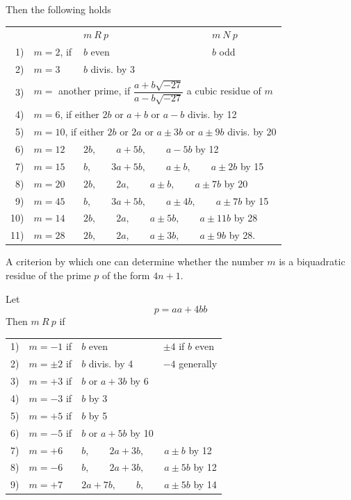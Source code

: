 \noindent\unskip{}Then the following holds
\begin{center}\footnotesize\setlength{\tabcolsep}{3pt}
\begin{tabular}{@{}rlll@{}}
& &$m\ R\ p$&$m\ N\ p$\\
1)&$m=2$, if&$b$ even&$b$ odd\\
2)&$m=3$&$b$ divis. by 3&\\
3)&\multicolumn{3}{l}{$m={}$ another prime, if $\dfrac{a+b\sqrt{-27}}{a-b\sqrt{-27}}$ a cubic residue of $m$}\\[5pt]
4)&\multicolumn{3}{l}{$m=6$, if either $2b$ or $a+b$ or $a-b$ divis. by 12}\\
5)&\multicolumn{3}{l}{$m=10$, if either $2b$ or $2a$ or $a\pm3b$ or $a\pm9b$ divis. by 20}\\
6)&$m=12$&\multicolumn{2}{l}{$2b,\qquad a+5b,\qquad a-5b$ by 12}\\
7)&$m=15$&\multicolumn{2}{l}{$b,\qquad 3a+5b,\qquad a\pm b,\qquad a\pm2b$ by 15}\\
8)&$m=20$&\multicolumn{2}{l}{$2b,\qquad2a,\qquad a\pm b,\qquad a\pm7b$ by 20}\\
9)&$m=45$&\multicolumn{2}{l}{$b,\qquad3a+5b,\qquad a\pm4b,\qquad a\pm7b$ by 15}\\
10)&$m=14$&\multicolumn{2}{l}{$2b,\qquad2a,\qquad a\pm5b,\qquad a\pm11b$ by 28}\\
11)&$m=28$&\multicolumn{2}{l}{$2b,\qquad2a,\qquad a\pm3b,\qquad a\pm9b$ by 28.}
\end{tabular}\end{center}
\medskip
\par\noindent\hspace*{\parindent}A criterion by which one can determine whether the number $m$ is a biquadratic residue of the prime $p$ of the form $4n+1$.

Let
\[p=aa+4bb\]
\noindent Then $m\ R\ p$ if
\begin{center}\small\setlength{\tabcolsep}{3pt}\begin{tabular}{@{}rlll@{}}
1)&$m=-1$ if&$b$ even&$\pm4$ if $b$ even\\
2)&$m=\pm2$ if&$b$ divis. by 4&$-4$ generally\\
3)&$m=+3$ if&$b$ or $a+3b$ by 6&\\
4)&$m=-3$ if&$b$ by 3&\\
5)&$m=+5$ if&$b$ by 5&\\
6)&$m=-5$ if&$b$ or $a+5b$ by 10&\\
7)&$m=+6$&\multicolumn{2}{l}{$b,\qquad2a+3b,\qquad a\pm b$ by 12}\\
8)&$m=-6$&\multicolumn{2}{l}{$b,\qquad2a+3b,\qquad a\pm5b$ by 12}\\
9)&$m=+7$&\multicolumn{2}{l}{$2a+7b,\qquad b,\qquad a\pm5b$ by 14}
\end{tabular}\end{center}
